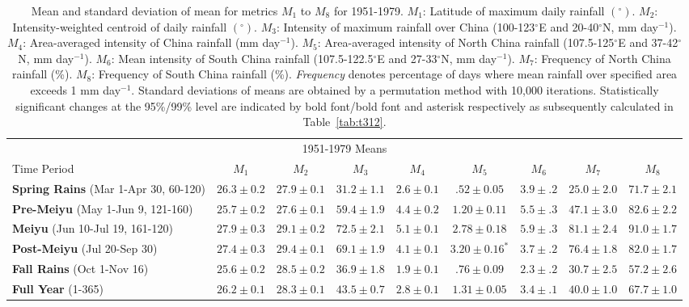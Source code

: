 \documentclass{ametsoc}
\begin{document}
\begin{landscape}
\begin{table}[p]
\footnotesize
\centering

\caption{Mean and standard deviation of mean for metrics $M_1$ to $M_8$ for 1951-1979. $M_1$: Latitude of maximum daily rainfall $(^\circ)$. $M_2$: Intensity-weighted centroid of daily rainfall $(^\circ)$. $M_3$: Intensity of maximum rainfall over China (100-123$^{\circ}$E and 20-40$^{\circ}$N, mm day$^{-1}$). $M_4$: Area-averaged intensity of China rainfall (mm day$^{-1}$). $M_5$: Area-averaged intensity of North China rainfall (107.5-125$^{\circ}$E and 37-42$^{\circ}$N,  mm day$^{-1}$). $M_6$: Mean intensity of South China rainfall (107.5-122.5$^{\circ}$E and 27-33$^{\circ}$N, mm day$^{-1}$). $M_7$: Frequency of North China rainfall (\%). $M_8$: Frequency of South China rainfall (\%). \textit{Frequency} denotes percentage of days where mean rainfall over specified area exceeds 1 mm day$^{-1}$. Standard deviations of means are obtained by a permutation method with 10,000 iterations. Statistically significant changes at the 95\%/99\% level are indicated by bold font/bold font and asterisk respectively as subsequently calculated in Table~\ref{tab:t312}.}

\begin{tabular}{ l c c c c c c c c}
	 \multicolumn{9}{c}{1951-1979 Means}  \\
	 Time Period 								& $M_1$ 		& $M_2$ 					& $M_3$ 		& $M_4$ 		& $M_5$ 						& $M_6$ 		& $M_7$ 		& $M_8$ \\
	 \hline
	\textbf{Spring Rains} (Mar 1-Apr 30, 60-120) 	& $26.3 \pm 0.2$ 	&  $\boldsymbol{27.9 \pm 0.1}$	&  $31.2 \pm 1.1$ 	&$2.6 \pm 0.1$ 	& $.52 \pm 0.05$ 					& $3.9 \pm .2$	& $25.0 \pm 2.0$	& $71.7 \pm 2.1$  \\
	\textbf{Pre-Meiyu} (May 1-Jun 9, 121-160) 		& $25.7 \pm 0.2$ 	&  $27.6 \pm 0.1$				&  $59.4 \pm 1.9$ 	&$4.4 \pm 0.2$	& $1.20 \pm 0.11$ 				& $5.5 \pm .3$	& $47.1 \pm 3.0$ 	& $82.6 \pm 2.2$ \\
	\textbf{Meiyu} (Jun 10-Jul 19, 161-120) 		& $27.9 \pm 0.3$ 	&  $29.1 \pm 0.2$				&  $72.5 \pm 2.1$ 	&$5.1 \pm 0.1$ 	& $2.78 \pm 0.18$					& $5.9 \pm .3$ 	& $81.1 \pm 2.4$ 	& $91.0 \pm 1.7$ \\
	\textbf{Post-Meiyu} (Jul 20-Sep 30) 			& $27.4 \pm 0.3 $	&  $29.4 \pm 0.1$ 				&  $69.1 \pm 1.9$ 	&$4.1 \pm 0.1$ 	& $\boldsymbol{3.20 \pm 0.16^*}$	& $3.7 \pm .2$ 	& $76.4 \pm 1.8$ 	& $82.0 \pm 1.7$ \\
	\textbf{Fall Rains} (Oct 1-Nov 16) 				& $25.6 \pm 0.2 $ 	&  $28.5 \pm 0.2$				&  $36.9 \pm 1.8$ 	&$1.9 \pm 0.1$	& $.76 \pm 0.09$ 					& $2.3 \pm .2$ 	& $30.7 \pm 2.5$ 	& $57.2 \pm 2.6$ \\
	\textbf{Full Year} (1-365) 					& $26.2 \pm 0.1$ 	&  $28.3 \pm 0.1$ 				&  $43.5 \pm 0.7$ 	&$2.8 \pm 0.1$ 	& $\boldsymbol{1.31 \pm 0.05}$		& $3.4 \pm .1$ 	& $40.0 \pm 1.0$ 	& $67.7 \pm 1.0$ \\
\end{tabular}
\label{tab:t39}
\end{table}



\end{landscape}
\end{document}
